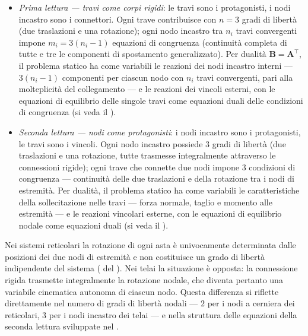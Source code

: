 \begin{itemize}[noitemsep]
	\item \emph{Prima lettura --- travi come corpi
		rigidi}: le travi sono i protagonisti, i nodi
	incastro sono i connettori. Ogni trave contribuisce
	con $n = 3$ gradi di libertà (due traslazioni e
	una rotazione); ogni nodo incastro tra $n_i$ travi
	convergenti impone $m_i = 3(n_i - 1)$ equazioni
	di congruenza (continuità completa di tutte e tre
	le componenti di spostamento generalizzato).
	Per dualità $\bm{B} = \bm{A}^\top$, il problema
	statico ha come variabili le reazioni dei nodi
	incastro interni --- $3(n_i-1)$ componenti per
	ciascun nodo con $n_i$ travi convergenti, pari
	alla molteplicità del collegamento --- e le
	reazioni dei vincoli esterni, con le equazioni
	di equilibrio delle singole travi come equazioni
	duali delle condizioni di congruenza (si veda il ).
	
	
	\item \emph{Seconda lettura --- nodi come
		protagonisti}: i nodi incastro sono i protagonisti,
	le travi sono i vincoli. Ogni nodo incastro
	possiede $3$ gradi di libertà (due traslazioni
	e una rotazione, tutte trasmesse integralmente
	attraverso le connessioni rigide); ogni trave
	che connette due nodi impone $3$ condizioni di
	congruenza --- continuità delle due traslazioni
	e della rotazione tra i nodi di estremità.
	Per dualità, il problema statico ha come variabili
	le caratteristiche della sollecitazione nelle
	travi --- forza normale, taglio e momento alle
	estremità --- e le reazioni vincolari esterne,
	con le equazioni di equilibrio nodale come
	equazioni duali (si veda il ).
\end{itemize}

\begin{oss}
	Nei sistemi reticolari la rotazione di ogni asta
	è univocamente determinata dalle posizioni dei due
	nodi di estremità e non costituisce un grado di
	libertà indipendente del sistema
	( del
	). Nei telai la situazione
	è opposta: la connessione rigida trasmette
	integralmente la rotazione nodale, che diventa
	pertanto una variabile cinematica autonoma di
	ciascun nodo. Questa differenza si riflette
	direttamente nel numero di gradi di libertà
	nodali --- $2$ per i nodi a cerniera dei
	reticolari, $3$ per i nodi incastro dei telai
	--- e nella struttura delle equazioni della
	seconda lettura sviluppate nel
	.
\end{oss}


